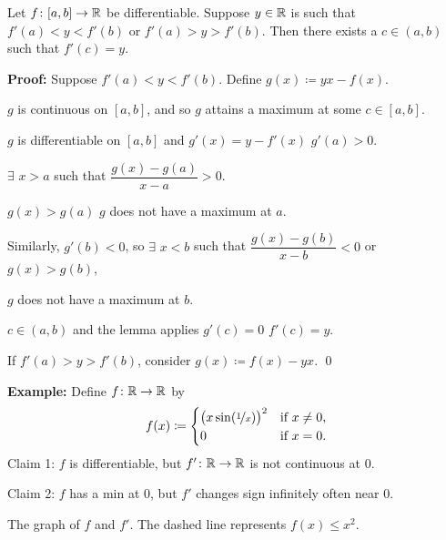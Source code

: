 \documentclass[10pt,aspectratio=169]{beamer}
\begin{document}
\begin{frame}

\begin{theorem}[Darboux]
Let $f \colon [a,b] \to {\mathbb{R}}$ be differentiable.  Suppose $y \in {\mathbb{R}}$ is such
that $f'(a) < y < f'(b)$ or
$f'(a) > y > f'(b)$.
Then there exists a $c \in (a,b)$ such that $f'(c) = y$.
\end{theorem}

\pause
\textbf{Proof:}
Suppose 
$f'(a) < y < f'(b)$.
\pause
Define
$g(x) \coloneqq yx - f(x)$.

\pause
$g$ is continuous on $[a,b]$, and so $g$ attains a maximum at some $c \in [a,b]$.

\pause
$g$ is differentiable on $[a,b]$ and $g'(x) = y-f'(x)$
\pause
\wthus $g'(a) > 0$.

\pause
\medskip
\thus \quad $\exists$ $x > a$ such that
$\dfrac{g(x)-g(a)}{x-a} > 0$.

\pause
\medskip

\thus \quad $g(x) > g(a)$
\pause
\wthus $g$ does not have a maximum at $a$.

\pause
\medskip

Similarly, $g'(b) < 0$, so $\exists$ $x < b$ such that
$\dfrac{g(x)-g(b)}{x-b} < 0$ or $g(x) > g(b)$,

\pause
\thus \quad $g$ does not have a maximum at $b$.

\pause
\medskip

\thus \quad $c \in (a,b)$ and the lemma applies  \wthus $g'(c)=0$
\pause
\wthus $f'(c) = y$.

\pause
\medskip

If $f'(a) > y > f'(b)$, consider $g(x) \coloneqq f(x)- yx$.
\qed

\end{frame}

\begin{frame}
\textbf{Example:}
Define $f \colon {\mathbb{R}} \to {\mathbb{R}}$ by
\begin{equation*}
f(x) \coloneqq
\begin{cases}
{\bigl( x \sin(\nicefrac{1}{x}) \bigr)}^2 & \text{if } x \not= 0, \\
0 & \text{if } x = 0.
\end{cases}
\end{equation*}
\pause
Claim 1: $f$ is differentiable, but $f' \colon {\mathbb{R}} \to {\mathbb{R}}$ is not continuous at
$0$.

\pause
\medskip

Claim 2: $f$ has a min at $0$, but $f'$
changes sign infinitely often near $0$.

\pause
\medskip


\medskip

The graph of $f$ and $f'$.  The dashed line represents $f(x) \leq x^2$.

\end{frame}
\end{document}
